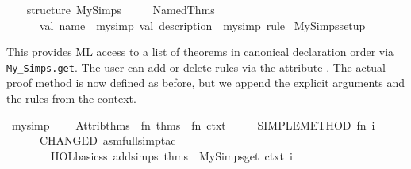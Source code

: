 \begin{isabellebody}
\begin{isamarkuptext}
\end{isamarkuptext}%
\isamarkuptrue%
%
\isadelimML
%
\endisadelimML
%
\isatagML
{}\isamarkupfalse%
\ {}\isanewline
\ \ structure\ My{}Simps\ {}\isanewline
\ \ \ \ Named{}Thms\isanewline
\ \ \ \ \ \ {}val\ name\ {}\ {}my{}simp{}\ val\ description\ {}\ {}my{}simp\ rule{}{}\isanewline
{}\isanewline
{}\isamarkupfalse%
\ My{}Simps{}setup%
\endisatagML
{\isafoldML}%
%
\isadelimML
%
\endisadelimML
%
\begin{isamarkuptext}%
This provides ML access to a list of theorems in canonical
  declaration order via \verb|My_Simps.get|.  The user can add or
  delete rules via the attribute \hyperlink{attribute.my-simp}{\mbox{}}.  The actual
  proof method is now defined as before, but we append the explicit
  arguments and the rules from the context.%
\end{isamarkuptext}%
\isamarkuptrue%
%
\isadelimML
%
\endisadelimML
%
\isatagML
{}\isamarkupfalse%
\ my{}simp{}\ {}\ {}\isanewline
\ \ Attrib{}thms\ {}{}\ {}fn\ thms\ {}{}\ fn\ ctxt\ {}{}\isanewline
\ \ \ \ SIMPLE{}METHOD{}\ {}fn\ i\ {}{}\isanewline
\ \ \ \ \ \ CHANGED\ {}asm{}full{}simp{}tac\isanewline
\ \ \ \ \ \ \ \ {}HOL{}basic{}ss\ addsimps\ {}thms\ {}\ My{}Simps{}get\ ctxt{}{}\ i{}{}{}\isanewline

\end{isabellebody}
